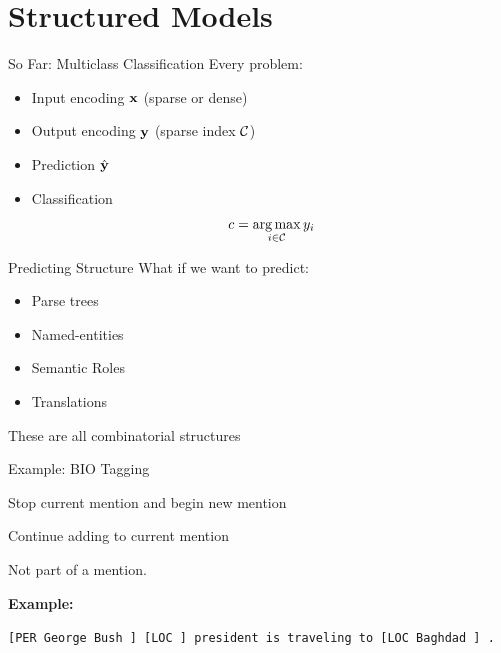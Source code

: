 \documentclass{beamer}
\begin{document}
\section{Structured Models}

\begin{frame}{So Far: Multiclass Classification}
  Every problem:
  \begin{itemize}
  \item Input encoding $\mathbf{x}$ (sparse or dense)
    \air 

  \item Output encoding $\mathbf{y}$ (sparse index $\mathcal{C}$)
    \air 
  
  \item Prediction $\hat{\mathbf{y}}$  
    \air 
    
  \item Classification 
    \[c = \argmax_{i\in \mcC} y_i \]
  \end{itemize}
\end{frame}

\begin{frame}{Predicting Structure}
  What if we want to predict:
  \air 

  \begin{itemize}
  \item Parse trees
    \air 

  \item Named-entities
    \air 

  \item Semantic Roles
    \air

  \item Translations
  \end{itemize}

  These are all combinatorial structures
\end{frame}

\begin{frame}{Example: BIO Tagging}
  \begin{description} \itemsep 20pt
  \item[B-TYPE] Stop current mention and begin new mention
    \air 
  \item[I-TYPE] Continue adding to current mention
  \item[O ] Not part of a mention.
  \end{description}
  \pause
  
  \textbf{Example:} \air

  \texttt{[PER \alert{George Bush} ]  [LOC  ] president is traveling to [LOC \alert{Baghdad} ] .  } 
\end{frame}
\end{document}
